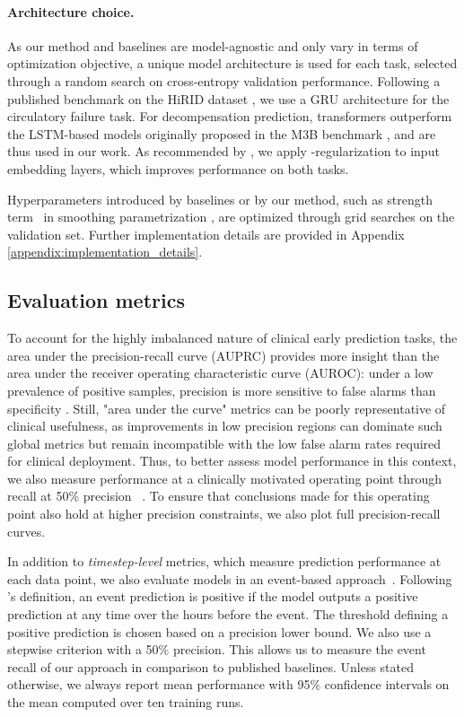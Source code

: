 \documentclass[nohyperref]{article}
\begin{document}
\paragraph{Architecture choice.} As our method and baselines are model-agnostic and only vary in terms of optimization objective, a unique model architecture is used for each task, selected through a random search on cross-entropy validation performance. Following a published benchmark on the HiRID dataset \citep{yeche2021}, we use a GRU \citep{DBLP:journals/corr/ChungGCB14} architecture for the {circulatory failure} task. For {decompensation} prediction, transformers \citep{DBLP:conf/nips/VaswaniSPUJGKP17} outperform the LSTM-based models \citep{hochreiter1997long} originally proposed in the M3B benchmark \citep{harutyunyan2019multitask}, and are thus used in our work. As recommended by \citet{tomavsev2019}, we apply -regularization to input embedding layers, which improves performance on both tasks. 

Hyperparameters introduced by baselines or by our method, such as strength term~ in smoothing parametrization , are optimized through grid searches on the validation set. Further implementation details are provided in Appendix \ref{appendix:implementation_details}.


\subsection{Evaluation metrics}
To account for the highly imbalanced nature of clinical early prediction tasks, the area under the precision-recall curve (AUPRC) provides more insight than the area under the receiver operating characteristic curve (AUROC): under a low prevalence of positive samples, precision is more sensitive to false alarms than specificity \citep{saito2015precision}. Still, "area under the curve" metrics can be poorly representative of clinical usefulness, as improvements in low precision regions can dominate such global metrics but remain incompatible with the low false alarm rates required for clinical deployment. Thus, to better assess model performance in this context, we also measure performance at a clinically motivated operating point through recall at 50\% precision ~\cite{tomavsev2021}. To ensure that conclusions made for this operating point also hold at higher precision constraints, we also plot full precision-recall curves. 

In addition to \textit{timestep-level} metrics, which measure prediction performance at each data point, we also evaluate models in an event-based approach~\cite{hyland2020,tomavsev2019}. Following \citet{tomavsev2019}'s definition, an event prediction is positive if the model outputs a positive prediction at any time over the  hours before the event. The threshold defining a positive prediction is chosen based on a precision lower bound. We also use a stepwise criterion with a 50\% precision. This allows us to measure the event recall of our approach in comparison to published baselines. Unless stated otherwise, we always report mean performance with 95\% confidence intervals on the mean computed over ten training runs.
\end{document}
